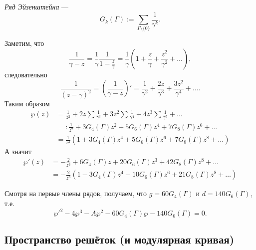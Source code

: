 \documentclass[12pt,a4paper]{article}
\begin{document}
    \begin{definition}
        \emph{Ряд Эйзенштейна} ---
        \[G_k(\Gamma) := \sum_{\Gamma \setminus \{0\}} \frac{1}{\gamma^k}.\]
    \end{definition}

    \begin{remark}
        Заметим, что
        \[
            \frac{1}{\gamma - z}
            = \frac{1}{\gamma} \frac{1}{1 - \frac{z}{\gamma}}
            = \frac{1}{\gamma} (1 + \frac{z}{\gamma} + \frac{z^2}{\gamma^2} + \dots),
        \]
        следовательно
        \[\frac{1}{(z - \gamma)^2} = \left(\frac{1}{\gamma - z}\right)' = \frac{1}{\gamma^2} + \frac{2z}{\gamma^3} + \frac{3z^2}{\gamma^4} + \dots.\]
        Таким образом
        \begin{align*}
            \wp(z)
            &= \frac{1}{z^2} + 2z \sum \frac{1}{\gamma^3} + 3z^2 \sum \frac{1}{\gamma^4} + 4z^3 \sum \frac{1}{\gamma^5} + \dots\\
            &=: \frac{1}{z^2} + 3 G_4(\Gamma) z^2 + 5 G_6(\Gamma) z^4 + 7 G_8(\Gamma) z^6 + \dots\\
            &= \frac{1}{z^2}(1 + 3 G_4(\Gamma) z^4 + 5 G_6(\Gamma) z^6 + 7 G_8(\Gamma) z^8 + \dots)
        \end{align*}
        А значит
        \begin{align*}
            \wp'(z)
            &= -\frac{2}{z^3} + 6 G_4(\Gamma) z + 20 G_6(\Gamma) z^3 + 42 G_8(\Gamma) z^8 + \dots\\
            &= -\frac{2}{z^3}(1 - 3 G_4(\Gamma) z^4 + 10 G_6(\Gamma) z^6 + 21 G_8(\Gamma) z^8 + \dots)
        \end{align*}
        
        Смотря на первые члены рядов, получаем, что $g = 60 G_4(\Gamma)$ и $d = 140 G_6(\Gamma)$, т.е.
        \[\wp'^2 - 4\wp^3 - A\wp^2 - 60 G_4(\Gamma) \wp - 140 G_6(\Gamma) = 0.\]
    \end{remark}

    \subsection*{Пространство решёток (и модулярная кривая)}
\end{document}
